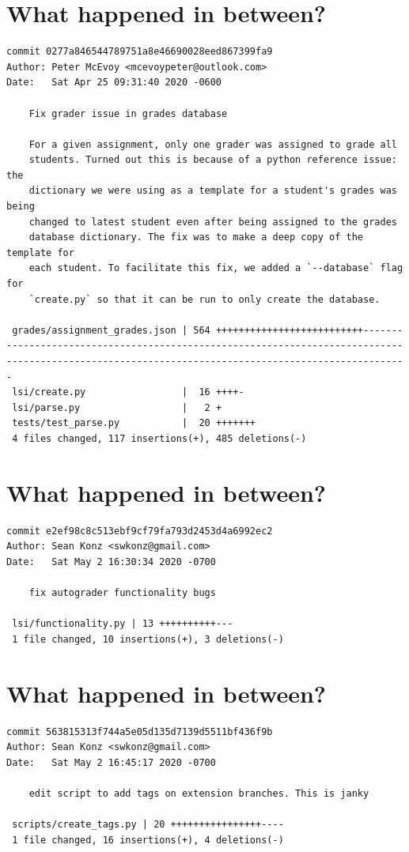 \documentclass{article}
\begin{document}
\newpage

\section*{What happened in between?}
\vspace{2ex}
\begin{verbatim}
commit 0277a846544789751a8e46690028eed867399fa9
Author: Peter McEvoy <mcevoypeter@outlook.com>
Date:   Sat Apr 25 09:31:40 2020 -0600

    Fix grader issue in grades database
    
    For a given assignment, only one grader was assigned to grade all
    students. Turned out this is because of a python reference issue: the
    dictionary we were using as a template for a student's grades was being
    changed to latest student even after being assigned to the grades
    database dictionary. The fix was to make a deep copy of the template for
    each student. To facilitate this fix, we added a `--database` flag for
    `create.py` so that it can be run to only create the database.

 grades/assignment_grades.json | 564 ++++++++++++++++++++++++++----------------------------------------------------------------------------------------------------------------------------------------------------
 lsi/create.py                 |  16 ++++-
 lsi/parse.py                  |   2 +
 tests/test_parse.py           |  20 +++++++
 4 files changed, 117 insertions(+), 485 deletions(-)
\end{verbatim}

\newpage

\section*{What happened in between?}
\vspace{2ex}
\begin{verbatim}
commit e2ef98c8c513ebf9cf79fa793d2453d4a6992ec2
Author: Sean Konz <swkonz@gmail.com>
Date:   Sat May 2 16:30:34 2020 -0700

    fix autograder functionality bugs

 lsi/functionality.py | 13 ++++++++++---
 1 file changed, 10 insertions(+), 3 deletions(-)
\end{verbatim}

\newpage

\section*{What happened in between?}
\vspace{2ex}
\begin{verbatim}
commit 563815313f744a5e05d135d7139d5511bf436f9b
Author: Sean Konz <swkonz@gmail.com>
Date:   Sat May 2 16:45:17 2020 -0700

    edit script to add tags on extension branches. This is janky

 scripts/create_tags.py | 20 ++++++++++++++++----
 1 file changed, 16 insertions(+), 4 deletions(-)


\end{verbatim}
\end{document}

